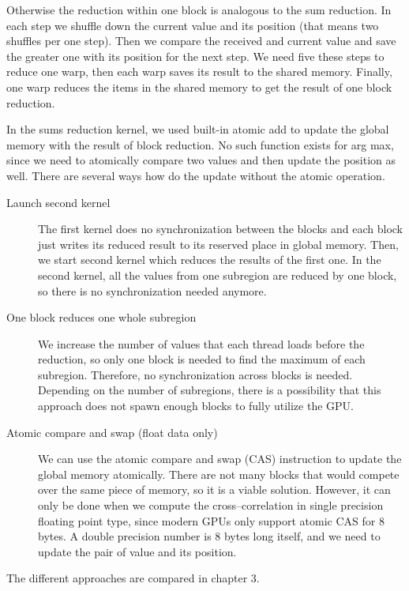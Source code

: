 Otherwise the reduction within one block is analogous to the sum reduction. In each step we shuffle down the current value and its position (that means two shuffles per one step). Then we compare the received and current value and save the greater one with its position for the next step. We need five these steps to reduce one warp, then each warp saves its result to the shared memory. Finally, one warp reduces the items in the shared memory to get the result of one block reduction.

In the sums reduction kernel, we used built-in atomic add to update the global memory with the result of block reduction. No such function exists for arg max, since we need to atomically compare two values and then update the position as well. There are several ways how do the update without the atomic operation.

\begin{description}
	\item[Launch second kernel] The first kernel does no synchronization between the blocks and each block just writes its reduced result to its reserved place in global memory. Then, we start second kernel which reduces the results of the first one. In the second kernel, all the values from one subregion are reduced by one block, so there is no synchronization needed anymore. 
	\item[One block reduces one whole subregion] We increase the number of values that each thread loads before the reduction, so only one block is needed to find the maximum of each subregion. Therefore, no synchronization across blocks is needed. Depending on the number of subregions, there is a possibility that this approach does not spawn enough blocks to fully utilize the GPU.
	\item[Atomic compare and swap (float data only)] We can use the atomic compare and swap (CAS) instruction to update the global memory atomically. There are not many blocks that would compete over the same piece of memory, so it is a viable solution. However, it can only be done when we compute the cross--correlation in single precision floating point type, since modern GPUs only support atomic CAS for 8 bytes. A double precision number is 8 bytes long itself, and we need to update the pair of value and its position. 
\end{description}

The different approaches are compared in chapter 3.



